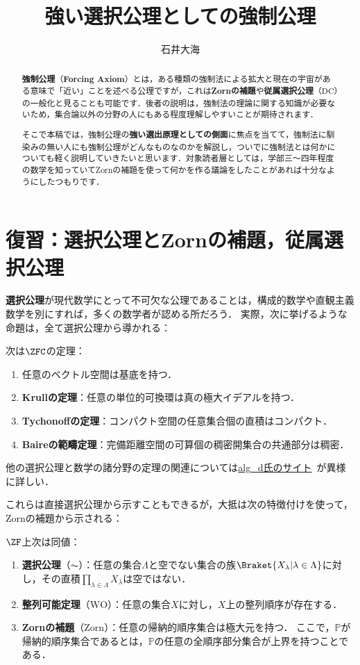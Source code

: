 \documentclass[a4j,leqno]{ltjsarticle}
\title{強い選択公理としての強制公理}
\author{石井大海}
\newcommand{\WO}{\mathrm{WO}}
\newcommand{\Zorn}{\mathrm{Zorn}}
\renewcommand{\emph}[1]{\textbf{\textsf{#1}}}
\begin{document}
\maketitle

\begin{abstract}
 \textbf{強制公理}（\emph{Forcing Axiom}）とは，ある種類の強制法による拡大と現在の宇宙がある意味で「近い」ことを述べる公理ですが，これは\textbf{Zornの補題}や\textbf{従属選択公理}（$\mathrm{DC}$）の一般化と見ることも可能です．後者の説明は，強制法の理論に関する知識が必要ないため，集合論以外の分野の人にもある程度理解しやすいことが期待されます．
 
  そこで本稿では，強制公理の\textbf{強い選出原理としての側面}に焦点を当てて，強制法に馴染みの無い人にも強制公理がどんなものなのかを解説し，ついでに強制法とは何かについても軽く説明していきたいと思います．対象読者層としては，学部三〜四年程度の数学を知っていてZornの補題を使って何かを作る議論をしたことがあれば十分なようにしたつもりです．
\end{abstract}

\section{復習：選択公理とZornの補題，従属選択公理}
\emph{選択公理}が現代数学にとって不可欠な公理であることは，構成的数学や直観主義数学を別にすれば，多くの数学者が認める所だろう．
実際，次に挙げるような命題は，全て選択公理から導かれる：
\begin{theorem}[ZFC]
 次は$\ZFC$の定理：
 \begin{enumerate}
  \item 任意のベクトル空間は基底を持つ．
  \item \emph{Krullの定理}：任意の単位的可換環は真の極大イデアルを持つ．
  \item \emph{Tychonoffの定理}：コンパクト空間の任意集合個の直積はコンパクト．
  \item \emph{Baireの範疇定理}：完備距離空間の可算個の稠密開集合の共通部分は稠密．
 \end{enumerate}
\end{theorem}
他の選択公理と数学の諸分野の定理の関連については\href{http://alg-d.com/math/ac/}{alg\_d氏のサイト}~\cite{alg-d}が異様に詳しい．

これらは直接選択公理から示すこともできるが，大抵は次の特徴付けを使って，Zornの補題から示される：
\begin{theorem}
 $\ZF$上次は同値：
 \begin{enumerate}
  \item \emph{選択公理}（$\AC$）：任意の集合$\Lambda$と空でない集合の族$\Braket{X_\lambda | \lambda \in \Lambda}$に対し，その直積$\prod_{\lambda \in \Lambda} X_\lambda$は空ではない．
  \item \emph{整列可能定理}（$\WO$）：任意の集合$X$に対し，$X$上の整列順序が存在する．
  \item \emph{Zornの補題}（$\Zorn$）：任意の帰納的順序集合は極大元を持つ．
        ここで，$\mathbb{P}$が帰納的順序集合であるとは，$\mathbb{P}$の任意の全順序部分集合が上界を持つことである．
 \end{enumerate}
\end{theorem}
\end{document}
